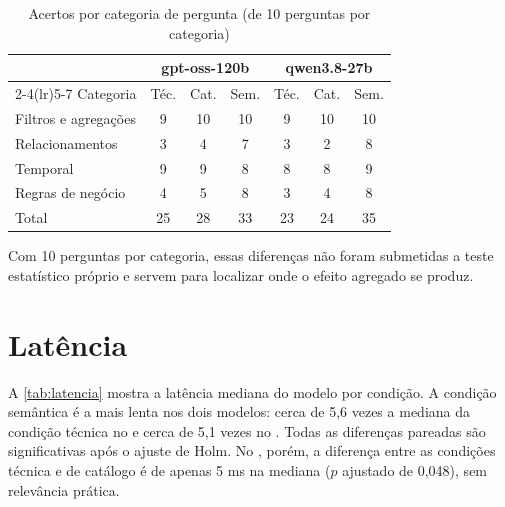 \begin{table}[htb]
  \centering
  \caption{Acertos por categoria de pergunta (de 10 perguntas por categoria)}
  \label{tab:categorias}
  \begin{tabular}{lcccccc}
    \toprule
    & \multicolumn{3}{c}{gpt-oss-120b} & \multicolumn{3}{c}{qwen3.8-27b} \\
    \cmidrule(lr){2-4}\cmidrule(lr){5-7}
    Categoria & Téc. & Cat. & Sem. & Téc. & Cat. & Sem. \\
    \midrule
    Filtros e agregações & 9 & 10 & 10 & 9 & 10 & 10 \\
    Relacionamentos      & 3 & 4  & 7  & 3 & 2  & 8 \\
    Temporal             & 9 & 9  & 8  & 8 & 8  & 9 \\
    Regras de negócio    & 4 & 5  & 8  & 3 & 4  & 8 \\
    \midrule
    Total                & 25 & 28 & 33 & 23 & 24 & 35 \\
    \bottomrule
  \end{tabular}
\end{table}

Com 10 perguntas por categoria, essas diferenças não foram submetidas a
teste estatístico próprio e servem para localizar onde o efeito agregado
se produz.

\section{Latência}
\label{sec:latencia}

A \autoref{tab:latencia} mostra a latência mediana do modelo por condição.
A condição semântica é a mais lenta nos dois modelos: cerca de 5,6 vezes a
mediana da condição técnica no  e cerca de 5,1 vezes no
. Todas as diferenças pareadas são significativas após o
ajuste de Holm. No , porém, a diferença entre as
condições técnica e de catálogo é de apenas 5 ms na mediana ($p$ ajustado
de 0,048), sem relevância prática.

